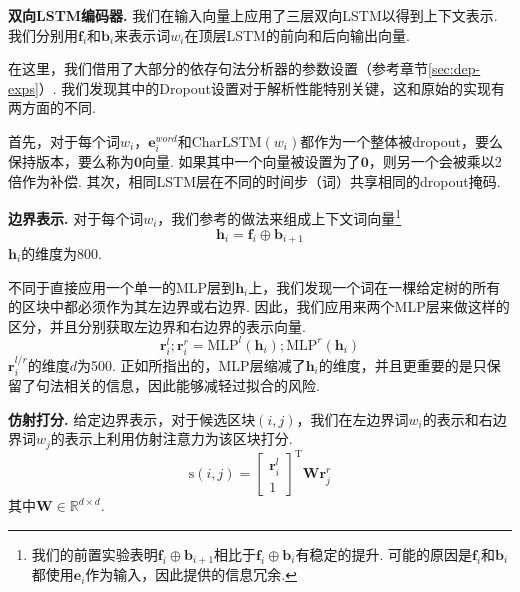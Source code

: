 \noindent\textbf{双向LSTM编码器.}
我们在输入向量上应用了三层双向LSTM以得到上下文表示.
我们分别用$\mathbf{f}_i$和$\mathbf{b}_i$来表示词$w_i$在顶层LSTM的前向和后向输出向量.

在这里，我们借用了大部分\citep{dozat-etal-2017-biaffine}的依存句法分析器的参数设置（参考章节\ref{sec:dep-exps}）.
我们发现其中的Dropout设置对于解析性能特别关键，这和原始的实现\citep{stern-etal-2017-minimal}有两方面的不同.

首先，对于每个词$w_i$，$\mathbf{e}^{word}_i$和$\mathrm{CharLSTM}(w_i)$都作为一个整体被dropout，要么保持版本，要么称为$\mathbf{0}$向量.
如果其中一个向量被设置为了$\mathbf{0}$，则另一个会被乘以2倍作为补偿.
其次，相同LSTM层在不同的时间步（词）共享相同的dropout掩码\citep{yarin-etal-2016-dropout}.

\noindent\textbf{边界表示.}
对于每个词$w_i$，我们参考\citep{stern-etal-2017-minimal}的做法来组成上下文词向量\footnote{我们的前置实验表明$\mathbf{f}_i \oplus \mathbf{b}_{i+1}$相比于$\mathbf{f}_i \oplus \mathbf{b}_i$有稳定的提升. 可能的原因是$\mathbf{f}_i$和$\mathbf{b}_i$都使用$\mathbf{e}_i$作为输入，因此提供的信息冗余.}
\begin{equation}
  \mathbf{h}_i = \mathbf{f}_i \oplus \mathbf{b}_{i+1}
\end{equation}
$\mathbf{h}_i$的维度为800.

不同于直接应用一个单一的MLP层到$\mathbf{h}_i$上，我们发现一个词在一棵给定树的所有的区块中都必须作为其左边界或右边界.
因此，我们应用来两个MLP层来做这样的区分，并且分别获取左边界和右边界的表示向量.
\begin{equation}
  \label{mlp-boundaries}
  \mathbf{r}_i^{l}; \mathbf{r}_i^{r} =\mathrm{MLP}^{l} \left( \mathbf{h}_i \right); \mathrm{MLP}^{r} \left( \mathbf{h}_i \right)
\end{equation}
$\mathbf{r}_i^{l/r}$的维度$d$为500.
正如\citep{dozat-etal-2017-biaffine}所指出的，MLP层缩减了$\mathbf{h}_i$的维度，并且更重要的是只保留了句法相关的信息，因此能够减轻过拟合的风险.

\noindent\textbf{仿射打分.}
给定边界表示，对于候选区块$(i,j)$，我们在左边界词$w_i$的表示和右边界词$w_j$的表示上利用仿射注意力为该区块打分.
\begin{equation} \label{eq:con-biaffine}
  \mathrm{s}(i,j) =  \left[
    \begin{array}{c}
      \mathbf{r}_{i}^{l} \\
      1
    \end{array}
    \right]^\mathrm{T}
  \mathbf{W} \mathbf{r}_{j}^{r}
\end{equation}
其中$\mathbf{W} \in \mathbb{R}^{d \times d}$.

